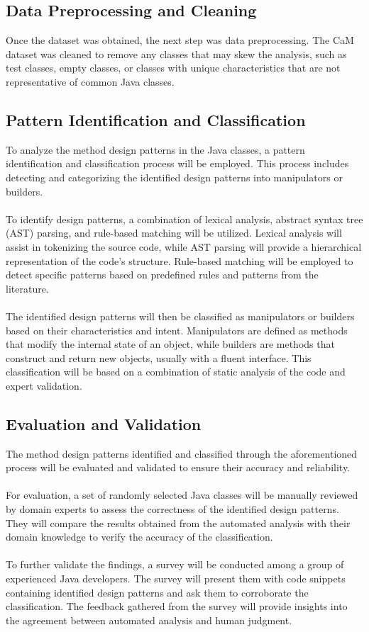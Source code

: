 \documentclass[draft]{article}
\begin{document}
\subsection{Data Preprocessing and Cleaning}
Once the dataset was obtained, the next step was data preprocessing. The CaM dataset was cleaned to remove any classes that may skew the analysis, such as test classes, empty classes, or classes with unique characteristics that are not representative of common Java classes.
\subsection{Pattern Identification and Classification}
To analyze the method design patterns in the Java classes, a pattern identification and classification process will be employed. This process includes detecting and categorizing the identified design patterns into manipulators or builders.\\
~\\
To identify design patterns, a combination of lexical analysis, abstract syntax tree (AST) parsing, and rule-based matching will be utilized. Lexical analysis will assist in tokenizing the source code, while AST parsing will provide a hierarchical representation of the code's structure. Rule-based matching will be employed to detect specific patterns based on predefined rules and patterns from the literature.\\
~\\
The identified design patterns will then be classified as manipulators or builders based on their characteristics and intent. Manipulators are defined as methods that modify the internal state of an object, while builders are methods that construct and return new objects, usually with a fluent interface. This classification will be based on a combination of static analysis of the code and expert validation.
\subsection{Evaluation and Validation}
The method design patterns identified and classified through the aforementioned process will be evaluated and validated to ensure their accuracy and reliability.\\
~\\
For evaluation, a set of randomly selected Java classes will be manually reviewed by domain experts to assess the correctness of the identified design patterns. They will compare the results obtained from the automated analysis with their domain knowledge to verify the accuracy of the classification.\\
~\\
To further validate the findings, a survey will be conducted among a group of experienced Java developers. The survey will present them with code snippets containing identified design patterns and ask them to corroborate the classification. The feedback gathered from the survey will provide insights into the agreement between automated analysis and human judgment.
\end{document}
